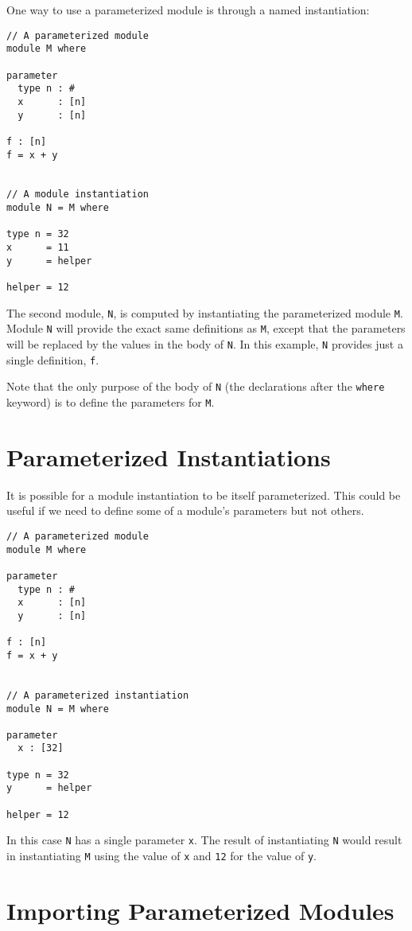 One way to use a parameterized module is through a named instantiation:

\begin{verbatim}
// A parameterized module
module M where

parameter
  type n : #
  x      : [n]
  y      : [n]

f : [n]
f = x + y


// A module instantiation
module N = M where

type n = 32
x      = 11
y      = helper

helper = 12
\end{verbatim}

The second module, \texttt{N}, is computed by instantiating the
parameterized module \texttt{M}. Module \texttt{N} will provide the
exact same definitions as \texttt{M}, except that the parameters will be
replaced by the values in the body of \texttt{N}. In this example,
\texttt{N} provides just a single definition, \texttt{f}.

Note that the only purpose of the body of \texttt{N} (the declarations
after the \texttt{where} keyword) is to define the parameters for
\texttt{M}.

\section{Parameterized
Instantiations}\label{parameterized-instantiations}

It is possible for a module instantiation to be itself parameterized.
This could be useful if we need to define some of a module's parameters
but not others.

\begin{verbatim}
// A parameterized module
module M where

parameter
  type n : #
  x      : [n]
  y      : [n]

f : [n]
f = x + y


// A parameterized instantiation
module N = M where

parameter
  x : [32]

type n = 32
y      = helper

helper = 12
\end{verbatim}

In this case \texttt{N} has a single parameter \texttt{x}. The result of
instantiating \texttt{N} would result in instantiating \texttt{M} using
the value of \texttt{x} and \texttt{12} for the value of \texttt{y}.

\section{Importing Parameterized
Modules}\label{importing-parameterized-modules}

